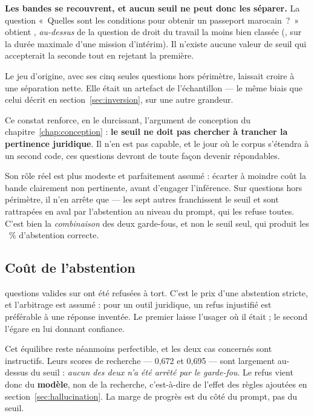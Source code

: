 \begin{limite}
\textbf{Les bandes se recouvrent, et aucun seuil ne peut donc les séparer.} La question
«~Quelles sont les conditions pour obtenir un passeport marocain~?~» obtient \ScoreJuridiqueMax{},
\emph{au-dessus} de la question de droit du travail la moins bien classée (\ScoreInMin{}, sur la
durée maximale d'une mission d'intérim). Il n'existe aucune valeur de seuil qui accepterait la
seconde tout en rejetant la première.

\smallskip
Le jeu d'origine, avec ses cinq seules questions hors périmètre, laissait croire à une séparation
nette. Elle était un artefact de l'échantillon --- le même biais que celui décrit en
section~\ref{sec:inversion}, sur une autre grandeur.
\end{limite}

Ce constat renforce, en le durcissant, l'argument de conception du
chapitre~\ref{chap:conception} : \textbf{le seuil ne doit pas chercher à trancher la pertinence
juridique}. Il n'en est pas capable, et le jour où le corpus s'étendra à un second code, ces
questions devront de toute façon devenir répondables.

Son rôle réel est plus modeste et parfaitement assumé : écarter à moindre coût la bande clairement
non pertinente, avant d'engager l'inférence. Sur \NbOutScope{} questions hors périmètre, il n'en
arrête que \NbGarde{} --- les sept autres franchissent le seuil et sont rattrapées en aval par
l'abstention au niveau du prompt, qui les refuse toutes. C'est bien la \emph{combinaison} des deux
garde-fous, et non le seuil seul, qui produit les \TauxAbstention~\% d'abstention correcte.

\subsection{Coût de l'abstention}

\NbRefusTort{} questions valides sur \NbInScope{} ont été refusées à tort. C'est le prix d'une
abstention stricte, et l'arbitrage est assumé : pour un outil juridique, un refus injustifié est
préférable à une réponse inventée. Le premier laisse l'usager où il était ; le second l'égare en
lui donnant confiance.

Cet équilibre reste néanmoins perfectible, et les deux cas concernés sont instructifs. Leurs scores
de recherche --- 0,672 et 0,695 --- sont largement au-dessus du seuil : \emph{aucun des deux n'a
été arrêté par le garde-fou}. Le refus vient donc du \textbf{modèle}, non de la recherche,
c'est-à-dire de l'effet des règles ajoutées en section~\ref{sec:hallucination}. La marge de progrès
est du côté du prompt, pas du seuil.

